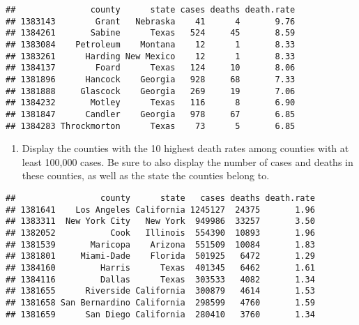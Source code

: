 \documentclass[
]{article}
\newenvironment{Shaded}{\begin{snugshade}}{\end{snugshade}}
\newcommand{\AttributeTok}[1]{\textcolor[rgb]{0.77,0.63,0.00}{#1}}
\newcommand{\ConstantTok}[1]{\textcolor[rgb]{0.00,0.00,0.00}{#1}}
\newcommand{\DecValTok}[1]{\textcolor[rgb]{0.00,0.00,0.81}{#1}}
\newcommand{\FunctionTok}[1]{\textcolor[rgb]{0.00,0.00,0.00}{#1}}
\newcommand{\NormalTok}[1]{#1}
\newcommand{\SpecialCharTok}[1]{\textcolor[rgb]{0.00,0.00,0.00}{#1}}
\providecommand{\tightlist}{%
  \setlength{\itemsep}{0pt}\setlength{\parskip}{0pt}}
\begin{document}
\begin{Shaded}
\end{Shaded}

\begin{verbatim}
##               county      state cases deaths death.rate
## 1383143        Grant   Nebraska    41      4       9.76
## 1384261       Sabine      Texas   524     45       8.59
## 1383084    Petroleum    Montana    12      1       8.33
## 1383261      Harding New Mexico    12      1       8.33
## 1384137        Foard      Texas   124     10       8.06
## 1381896      Hancock    Georgia   928     68       7.33
## 1381888     Glascock    Georgia   269     19       7.06
## 1384232       Motley      Texas   116      8       6.90
## 1381847      Candler    Georgia   978     67       6.85
## 1384283 Throckmorton      Texas    73      5       6.85
\end{verbatim}

\begin{enumerate}
\def\labelenumi{\alph{enumi}.}
\setcounter{enumi}{5}
\tightlist
\item
  Display the counties with the 10 highest death rates among counties
  with at least 100,000 cases. Be sure to also display the number of
  cases and deaths in these counties, as well as the state the counties
  belong to.
\end{enumerate}

\begin{Shaded}
\end{Shaded}

\begin{verbatim}
##                 county      state   cases deaths death.rate
## 1381641    Los Angeles California 1245127  24375       1.96
## 1383311  New York City   New York  949986  33257       3.50
## 1382052           Cook   Illinois  554390  10893       1.96
## 1381539       Maricopa    Arizona  551509  10084       1.83
## 1381801     Miami-Dade    Florida  501925   6472       1.29
## 1384160         Harris      Texas  401345   6462       1.61
## 1384116         Dallas      Texas  303533   4082       1.34
## 1381655      Riverside California  300879   4614       1.53
## 1381658 San Bernardino California  298599   4760       1.59
## 1381659      San Diego California  280410   3760       1.34
\end{verbatim}
\end{document}
